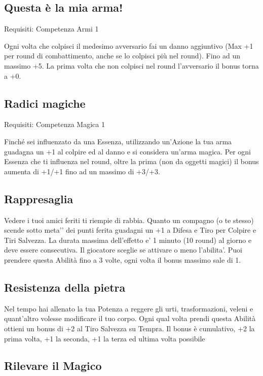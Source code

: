 \documentclass[a4paper,11pt,twoside,openany]{book}
\begin{document}
\subsection{Questa è la mia arma!}

Requisiti: Competenza Armi 1

Ogni volta che colpisci il medesimo avversario fai un danno aggiuntivo (Max +1 per round di combattimento, anche se lo colpisci più nel round). Fino ad un massimo +5. La prima volta che non colpisci nel round l'avversario il bonus torna a +0.

\subsection{Radici magiche}

Requisiti: Competenza Magica 1

Finché sei influenzato da una Essenza, utilizzando un'Azione la tua arma guadagna un +1 al colpire ed al danno e si considera un'arma magica. Per ogni Essenza che ti influenza nel round, oltre la prima (non da oggetti magici) il bonus aumenta di +1/+1 fino ad un massimo di +3/+3.

\subsection{Rappresaglia}

Vedere i tuoi amici feriti ti riempie di rabbia.
Quanto un compagno (o te stesso) scende sotto meta'’ dei punti ferita guadagni un +1 a Difesa e Tiro per Colpire e Tiri Salvezza. La durata massima dell’effetto e’ 1 minuto (10 round) al giorno e deve essere consecutiva. Il giocatore sceglie se attivare o meno l’abilita’.
Puoi prendere questa Abilità fino a 3 volte, ogni volta il bonus massimo sale di 1.

\subsection{Resistenza della pietra}

Nel tempo hai allenato la tua Potenza a reggere gli urti, trasformazioni, veleni e quant'altro volesse modificare il tuo corpo. Ogni qual volta prendi questa Abilità ottieni un bonus di +2 al Tiro Salvezza su Tempra. Il bonus è cumulativo, +2 la prima volta, +1 la seconda, +1 la terza ed ultima volta possibile

\subsection{Rilevare il Magico}
\end{document}
